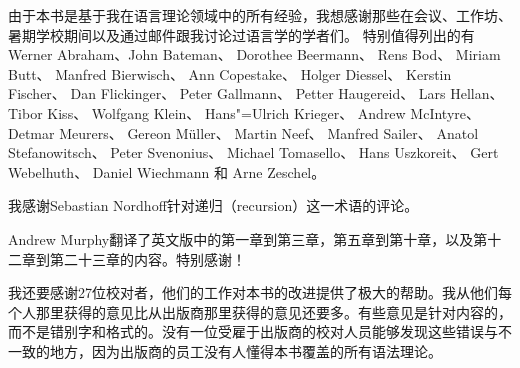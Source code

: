由于本书是基于我在语言理论领域中的所有经验，我想感谢那些在会议、工作坊、暑期学校期间以及通过邮件跟我讨论过语言学的学者们。
特别值得列出的有Werner Abraham、John Bateman、
Dorothee Beermann、
Rens Bod、
Miriam Butt、
Manfred Bierwisch、
Ann Copestake、
Holger Diessel、
Kerstin Fischer、
Dan Flickinger、
Peter Gallmann、
Petter Haugereid、
Lars Hellan、
Tibor Kiss、
Wolfgang Klein、 
Hans"=Ulrich Krieger、
Andrew McIntyre、
Detmar Meurers、
Gereon Müller、
Martin Neef、
Manfred Sailer、 
Anatol Stefanowitsch、
Peter Svenonius、
Michael Tomasello、 
Hans Uszkoreit、
Gert Webelhuth、
Daniel Wiechmann 
和
Arne Zeschel。

我感谢Sebastian Nordhoff针对递归（recursion）这一术语的评论。

Andrew Murphy翻译了英文版中的第一章到第三章，第五章到第十章，以及第十二章到第二十三章的内容。特别感谢！

我还要感谢27位校对者，他们的工作对本书的改进提供了极大的帮助。我从他们每个人那里获得的意见比从出版商那里获得的意见还要多。有些意见是针对内容的，而不是错别字和格式的。没有一位受雇于出版商的校对人员能够发现这些错误与不一致的地方，因为出版商的员工没有人懂得本书覆盖的所有语法理论。

